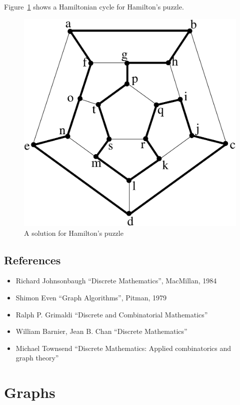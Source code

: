 Figure~\ref{hamiltonkring} shows a Hamiltonian cycle for Hamilton's puzzle.

\begin{figure}[ht]
\begin{center}
\includegraphics[width=0.6\linewidth,keepaspectratio]{hamiltonkring}
\end{center}
\caption{A solution for Hamilton's puzzle
\label{hamiltonkring}}
\end{figure}

\section{References}

\begin{itemize}
\item
Richard Johnsonbaugh ``Discrete Mathematics'', MacMillan, 1984
\item
Shimon Even ``Graph Algorithms'', Pitman, 1979
\item
Ralph P. Grimaldi ``Discrete and Combinatorial Mathematics''
\item
William Barnier, Jean B. Chan ``Discrete Mathematics''
\item
Michael Townsend ``Discrete Mathematics: Applied combinatorics and \\
graph theory''
\end{itemize}



\chapter{Graphs}

